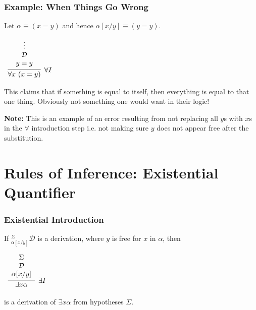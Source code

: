 \documentclass{beamer}
\theoremstyle{indentDefn} \newtheorem{defn}[]{Definition}
\begin{document}
\begin{frame}
	\frametitle{Example: When Things Go Wrong}
	
	Let $\alpha \equiv (x = y)$ and hence $\alpha[x/y] \equiv (y = y)$.

	\begin{center}
		$\begin{array}{c}
			\infer[\forall I]{\forall x \ (x = y)}
				{\begin{array}{c} \vdots \\ \mathcal{D} \\ y = y \end{array}}
		\end{array}$
	\end{center}

	This claims that if something is equal to itself, then everything is equal to that one thing. Obviously not something one would want in their logic!

	{\bf Note:} This is an example of an error resulting from not replacing all $y$s with $x$s in the $\forall$ introduction step i.e. not making sure $y$ does not appear free after the substitution. 

	\vspace{1cm}
	
\end{frame}

\section{Rules of Inference: Existential Quantifier}

\begin{frame}
	\frametitle{Existential Introduction}
	
	If $^{\Sigma}_{\alpha[x/y]}\mathcal{D}$ is a derivation, where $y$ is free for $x$ in $\alpha$, then
	
	\vspace{0.5cm}
	
	\begin{center}
		$\begin{array}{c}
		\infer[\exists I]{\exists x \alpha}{\begin{array}{c} 
			\Sigma \\
			\mathcal{D} \\ 
			\alpha[x/y]			
			\end{array}}
		\end{array}$
	\end{center}
	
	is a derivation of $\exists x \alpha$ from hypotheses $\Sigma$. 
	
\end{frame}
\end{document}
